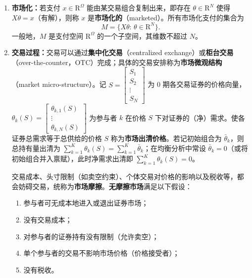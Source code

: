 \begin{tcolorbox}[knowledge,title=2.3 证券市场]
\begin{enumerate}
    \item \textbf{市场化：}若支付 $x\in\mathrm{R}^{\Omega}$ 能由某交易组合复制出来，即存在 $\theta\in\mathrm{R}^{N}$ 使得 $X\theta=x$（有解），则称 $x$ 是\textbf{市场化的}（marketed）。所有市场化支付的集合为
    \[
        M=\{X\theta:\,\theta\in\mathrm{R}^{N}\}.
    \]
    一般地，$M$ 是支付空间 $\mathrm{R}^{\Omega}$ 的一个子空间，其维数不超过 $N$。

    \item \textbf{交易过程：}交易可以通过\textbf{集中化交易}（centralized exchange）或\textbf{柜台交易}（over-the-counter，OTC）完成；具体的交易安排称为\textbf{市场微观结构}（market micro-structure）。记 $S=\begin{bmatrix}S_1 \\ S_2 \\ \vdots \\ S_N\end{bmatrix}$ 为 0 期各交易证券的价格向量，$\theta_k(S)=\begin{bmatrix}\theta_{k,1}(S) \\ \vdots \\ \theta_{k,N}(S)\end{bmatrix}$ 为参与者 $k$ 在价格 $S$ 下对证券的（净）需求。使各证券总需求等于总供给的价格 $S$ 称为\textbf{市场出清价格}。若记初始组合为 $\bar{\theta}_k$，则总持有量出清为 $\sum_{k=1}^{K}\theta_k(S)=\sum_{k=1}^{K}\bar{\theta}_k$；在均衡分析中常设 $\bar{\theta}_k=0$（或将初始组合并入禀赋），此时净需求出清即 $\sum_{k=1}^{K}\theta_k(S)=0$。

    交易成本、头寸限制（如卖空约束）、个体交易对价格的影响以及税收等，都会妨碍交易，统称为\textbf{市场摩擦}。\textbf{无摩擦市场}满足以下假设：
    \begin{enumerate}
        \item 参与者可无成本地进入或退出证券市场；
        \item 没有交易成本；
        \item 对参与者的证券持有没有限制（允许卖空）；
        \item 单个参与者的交易不影响市场价格（价格接受者）；
        \item 没有税收。
    \end{enumerate}
\end{enumerate}
\end{tcolorbox}

